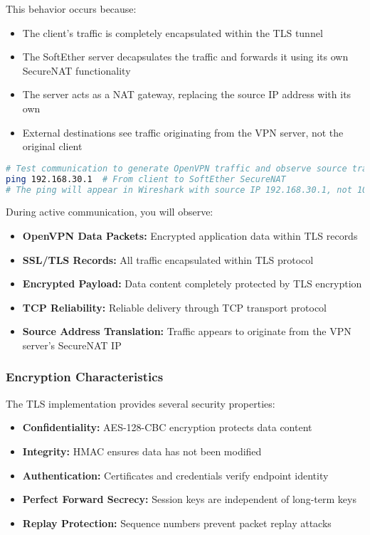 \noindent
This behavior occurs because:
\begin{itemize}
    \item The client's traffic is completely encapsulated within the TLS tunnel
    \item The SoftEther server decapsulates the traffic and forwards it using its own SecureNAT functionality
    \item The server acts as a NAT gateway, replacing the source IP address with its own
    \item External destinations see traffic originating from the VPN server, not the original client
\end{itemize}

\begin{lstlisting}[language=bash]
# Test communication to generate OpenVPN traffic and observe source translation
ping 192.168.30.1  # From client to SoftEther SecureNAT
# The ping will appear in Wireshark with source IP 192.168.30.1, not 10.0.2.2
\end{lstlisting}

\noindent
During active communication, you will observe:
\begin{itemize}
    \item \textbf{OpenVPN Data Packets:} Encrypted application data within TLS records
    \item \textbf{SSL/TLS Records:} All traffic encapsulated within TLS protocol
    \item \textbf{Encrypted Payload:} Data content completely protected by TLS encryption
    \item \textbf{TCP Reliability:} Reliable delivery through TCP transport protocol
    \item \textbf{Source Address Translation:} Traffic appears to originate from the VPN server's SecureNAT IP
\end{itemize}

\subsubsection{Encryption Characteristics}

The TLS implementation provides several security properties:

\begin{itemize}
    \item \textbf{Confidentiality:} AES-128-CBC encryption protects data content
    \item \textbf{Integrity:} HMAC ensures data has not been modified
    \item \textbf{Authentication:} Certificates and credentials verify endpoint identity
    \item \textbf{Perfect Forward Secrecy:} Session keys are independent of long-term keys
    \item \textbf{Replay Protection:} Sequence numbers prevent packet replay attacks
\end{itemize}

